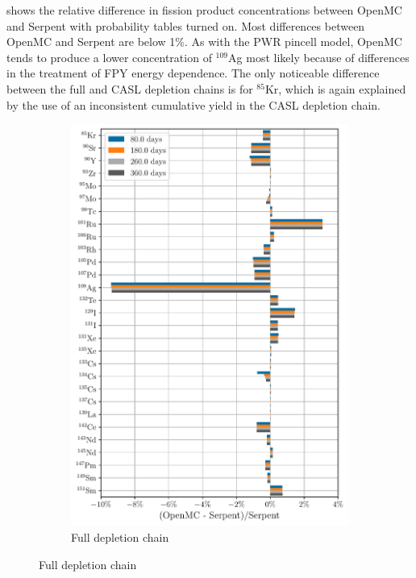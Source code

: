 \documentclass[3p,authoryear]{elsarticle}
\begin{document}
 shows the relative difference in fission product
concentrations between OpenMC and Serpent with probability tables turned on.
Most differences between OpenMC and Serpent are below 1\%. As with the PWR
pincell model, OpenMC tends to produce a lower concentration of $^{109}$Ag most
likely because of differences in the treatment of FPY energy dependence. The
only noticeable difference between the full and CASL depletion chains is for
$^{85}$Kr, which is again explained by the use of an inconsistent cumulative
yield in the CASL depletion chain.
\begin{figure}[H]
  \centering
  \begin{subfigure}[t]{0.45\textwidth}
    \includegraphics[width=\textwidth]{figures/sfr_fp_full_average.pdf}
    \caption{Full depletion chain}
  \end{subfigure}

\end{figure}
\end{document}
